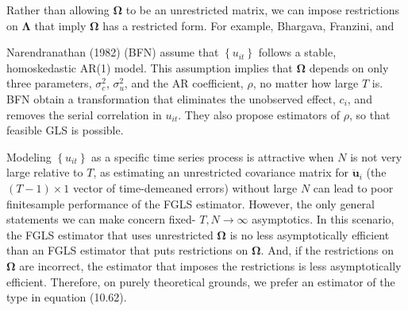 \documentclass[10pt]{article}
\begin{document}
Rather than allowing $\boldsymbol{\Omega}$ to be an unrestricted matrix, we can impose restrictions on $\boldsymbol{\Lambda}$ that imply $\boldsymbol{\Omega}$ has a restricted form. For example, Bhargava, Franzini, and

Narendranathan (1982) (BFN) assume that $\left\{u_{i t}\right\}$ follows a stable, homoskedastic AR(1) model. This assumption implies that $\boldsymbol{\Omega}$ depends on only three parameters, $\sigma_{c}^{2}$, $\sigma_{u}^{2}$, and the AR coefficient, $\rho$, no matter how large $T$ is. BFN obtain a transformation that eliminates the unobserved effect, $c_{i}$, and removes the serial correlation in $u_{i t}$. They also propose estimators of $\rho$, so that feasible GLS is possible.

Modeling $\left\{u_{i t}\right\}$ as a specific time series process is attractive when $N$ is not very large relative to $T$, as estimating an unrestricted covariance matrix for $\ddot{\mathbf{u}}_{i}$ (the $(T-1) \times 1$ vector of time-demeaned errors) without large $N$ can lead to poor finitesample performance of the FGLS estimator. However, the only general statements we can make concern fixed- $T, N \rightarrow \infty$ asymptotics. In this scenario, the FGLS estimator that uses unrestricted $\boldsymbol{\Omega}$ is no less asymptotically efficient than an FGLS estimator that puts restrictions on $\boldsymbol{\Omega}$. And, if the restrictions on $\boldsymbol{\Omega}$ are incorrect, the estimator that imposes the restrictions is less asymptotically efficient. Therefore, on purely theoretical grounds, we prefer an estimator of the type in equation (10.62).
\end{document}
